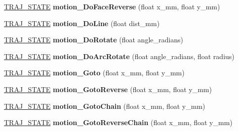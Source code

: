 \begin{DoxyCompactItemize}
\mbox{\label{classAsservDriver_a48ee3084417b1d06a79b2a80df9d3f09}} 
\hyperlink{path__manager_8h_adb3360abeb29758da93865c8afcb80eb}{T\+R\+A\+J\+\_\+\+S\+T\+A\+TE} {\bfseries motion\+\_\+\+Do\+Face\+Reverse} (float x\+\_\+mm, float y\+\_\+mm)
\item 
\mbox{\label{classAsservDriver_a1b4a90efa1f4416161944d9b164be2bc}} 
\hyperlink{path__manager_8h_adb3360abeb29758da93865c8afcb80eb}{T\+R\+A\+J\+\_\+\+S\+T\+A\+TE} {\bfseries motion\+\_\+\+Do\+Line} (float dist\+\_\+mm)
\item 
\mbox{\label{classAsservDriver_aca1011c3fb10e594e836ea4ada6b92ff}} 
\hyperlink{path__manager_8h_adb3360abeb29758da93865c8afcb80eb}{T\+R\+A\+J\+\_\+\+S\+T\+A\+TE} {\bfseries motion\+\_\+\+Do\+Rotate} (float angle\+\_\+radians)
\item 
\mbox{\label{classAsservDriver_aabc36af66a38e2fb735e764730328994}} 
\hyperlink{path__manager_8h_adb3360abeb29758da93865c8afcb80eb}{T\+R\+A\+J\+\_\+\+S\+T\+A\+TE} {\bfseries motion\+\_\+\+Do\+Arc\+Rotate} (float angle\+\_\+radians, float radius)
\item 
\mbox{\label{classAsservDriver_a69d5e40538845c81b490a1ac3444847f}} 
\hyperlink{path__manager_8h_adb3360abeb29758da93865c8afcb80eb}{T\+R\+A\+J\+\_\+\+S\+T\+A\+TE} {\bfseries motion\+\_\+\+Goto} (float x\+\_\+mm, float y\+\_\+mm)
\item 
\mbox{\label{classAsservDriver_a96a9ab08074048b626f5f812c82c7342}} 
\hyperlink{path__manager_8h_adb3360abeb29758da93865c8afcb80eb}{T\+R\+A\+J\+\_\+\+S\+T\+A\+TE} {\bfseries motion\+\_\+\+Goto\+Reverse} (float x\+\_\+mm, float y\+\_\+mm)
\item 
\mbox{\label{classAsservDriver_a990f4ca32eef38a88031daa07fbe4546}} 
\hyperlink{path__manager_8h_adb3360abeb29758da93865c8afcb80eb}{T\+R\+A\+J\+\_\+\+S\+T\+A\+TE} {\bfseries motion\+\_\+\+Goto\+Chain} (float x\+\_\+mm, float y\+\_\+mm)
\item 
\mbox{\label{classAsservDriver_a724a7b68fdf74793ee2d159f82fe50e5}} 
\hyperlink{path__manager_8h_adb3360abeb29758da93865c8afcb80eb}{T\+R\+A\+J\+\_\+\+S\+T\+A\+TE} {\bfseries motion\+\_\+\+Goto\+Reverse\+Chain} (float x\+\_\+mm, float y\+\_\+mm)

\end{DoxyCompactItemize}
